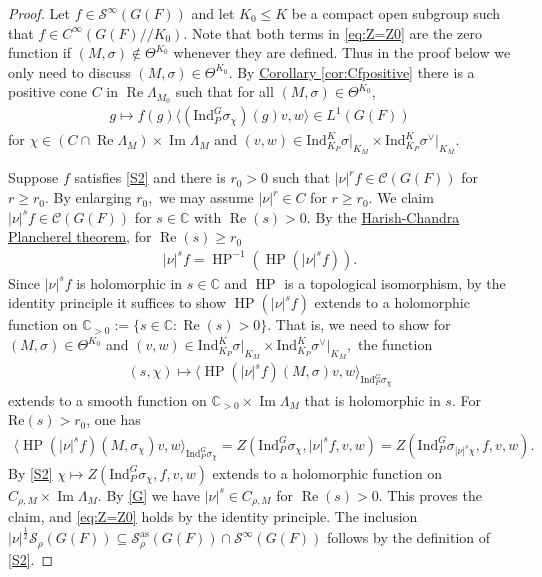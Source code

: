\documentclass[10pt]{amsart}
\theoremstyle{definition}
\numberwithin{equation}{section}
\numberwithin{equation}{subsection}
\newcommand{\Ind}{\mathrm{Ind}}
\newcommand{\CC}{\mathbb{C}}
\renewcommand{\Im}{\mathop{\mathrm{Im}}}
\renewcommand{\Re}{\mathop{\mathrm{Re}}}
\newcommand{\HP}{\mathop{\mathrm{HP}}\nolimits}
\begin{document}
\begin{proof} Let $f\in \mathcal{S}^\infty(G(F))$ and let $K_0\leq K$ be a compact open subgroup such that $f\in C^\infty(G(F)/\!/K_0)$. Note that both terms in \eqref{eq:Z=Z0} are the zero function if $(M,\sigma)\not\in \Theta^{K_0}$ whenever they are defined. Thus in the proof below we only need to discuss $(M,\sigma)\in \Theta^{K_0}.$ By \hyperref[cor:Cfpositive]{Corollary \ref{cor:Cfpositive}} there is a positive cone $C$ in $\Re\Lambda_{M_0}$ such that for all $(M,\sigma)\in\Theta^{K_0}$,
\begin{align*}
    g\mapsto f(g)\langle(\Ind_P^G\sigma_\chi)(g)v,w\rangle \in L^1(G(F))
\end{align*}
for $\chi\in (C\cap \Re\Lambda_M)\times\Im\Lambda_M$ and $(v,w)\in  \Ind_{K_P}^K\sigma\vert_{K_M}\times \Ind_{K_P}^K\sigma^\vee\vert_{K_M}$. 

Suppose $f$ satisfies \eqref{S2} and there is $r_0>0$ such that $|\nu|^rf\in \mathcal{C}(G(F))$ for $r\geq r_0$. By enlarging $r_0,$ we may assume $|\nu|^r\in C$ for $r\ge r_0.$ We claim $|\nu|^s f \in \mathcal{C}(G(F))$ for $s\in \CC$ with $\Re(s)>0$. By the \hyperref[HCPlan]{Harish-Chandra Plancherel theorem}, for $\Re(s)\geq r_0$
\begin{align*}
    |\nu|^s f = \HP^{-1}(\HP(|\nu|^s f)).
\end{align*}
 Since $|\nu|^s f$ is holomorphic in $s\in \CC$ and $\HP$ is a topological isomorphism, by the identity principle it suffices to show $\HP(|\nu|^s f)$ extends to a holomorphic function on $\CC_{>0}:=\{s\in \CC: \Re(s)>0\}$. That is, we need to show for $(M,\sigma)\in \Theta^{K_0}$ and $(v,w)\in \Ind_{K_P}^K\sigma\vert_{K_M}\times \Ind_{K_P}^K\sigma^\vee\vert_{K_M},$ the function
\begin{align*}
  (s,\chi)\mapsto\langle\HP(|\nu|^s f)(M,\sigma)v,w\rangle_{\Ind_P^G\sigma_\chi}
\end{align*}
extends to a smooth function on $\CC_{>0}\times \Im\Lambda_M$ that is holomorphic in $s$.  For $\mathrm{Re}(s)>r_0$, one has
\begin{align*}
    \langle\HP(|\nu|^s f)(M,\sigma_\chi)v,w\rangle_{\Ind_P^G\sigma_\chi} = Z(\mathrm{Ind}_P^G\sigma_\chi,|\nu|^{s}f,v,w) = Z(\mathrm{Ind}_P^G\sigma_{|\nu|^s\chi},f,v,w).
\end{align*}
By \eqref{S2} $\chi\mapsto Z(\mathrm{Ind}_P^G\sigma_{\chi},f,v,w)$ extends to a holomorphic function on $C_{\rho,M}\times\Im\Lambda_M$. By \eqref{G} we have $|\nu|^{s}\in C_{\rho,M}$ for $\Re(s)>0$. This proves the claim, and \eqref{eq:Z=Z0} holds by the identity principle. The inclusion $|\nu|^{\frac{1}{2}}\mathcal{S}_\rho(G(F))\subseteq \mathcal{S}_\rho^{\mathrm{as}}(G(F))\cap \mathcal{S}^\infty(G(F))$ follows by the definition of \eqref{S2}. 


\end{proof}
\end{document}
